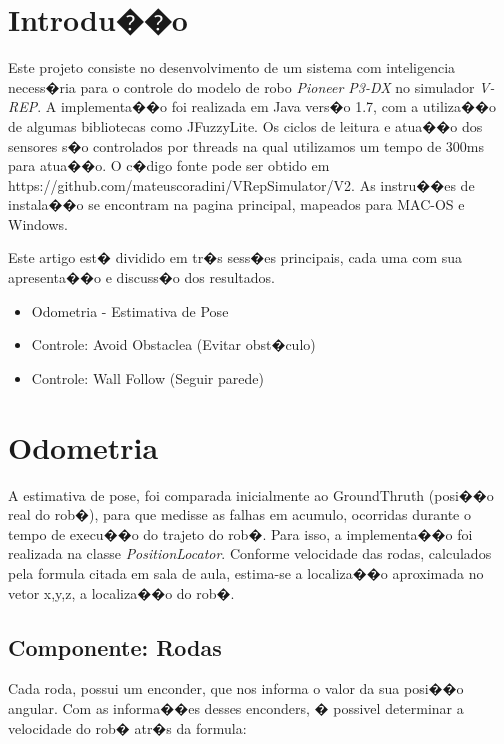 \documentclass[twoside,conference,a4paper]{IEEEtran}
\begin{document}

\section{Introdu��o}

Este projeto consiste no desenvolvimento de um sistema com inteligencia necess�ria para o controle do modelo de robo \textit{Pioneer P3-DX} no simulador \textit{V-REP}. A implementa��o foi realizada em Java vers�o 1.7, com a utiliza��o de algumas bibliotecas como JFuzzyLite. Os ciclos de leitura e atua��o dos sensores s�o controlados por threads na qual utilizamos um tempo de 300ms para atua��o. O c�digo fonte pode ser obtido em https://github.com/mateuscoradini/VRepSimulator/V2. As instru��es de instala��o se encontram na pagina principal, mapeados para MAC-OS e Windows. 

Este artigo est� dividido em tr�s sess�es principais, cada uma com sua apresenta��o e discuss�o dos resultados.

\begin{itemize}
 \item Odometria - Estimativa de Pose
 \item Controle: Avoid Obstaclea (Evitar obst�culo)
 \item Controle: Wall Follow (Seguir parede)
\end{itemize}


\section{Odometria}
A estimativa de pose, foi comparada inicialmente ao GroundThruth (posi��o real do rob�), para que medisse as falhas em acumulo, ocorridas durante o tempo de execu��o do trajeto do rob�.
Para isso, a implementa��o foi realizada na classe \textit{PositionLocator}. Conforme velocidade das rodas, calculados pela formula citada em sala de aula, estima-se a localiza��o aproximada no vetor x,y,z, a localiza��o do rob�.

\subsection{Componente: Rodas }
 Cada roda, possui um enconder, que nos informa o valor da sua posi��o angular. Com as informa��es desses enconders, � possivel determinar a velocidade do rob� atr�s da formula:
 
\end{document}
